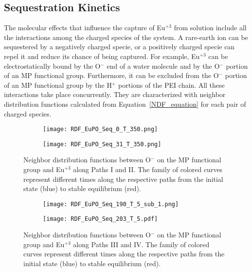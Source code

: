 \documentclass[
journal=jcisd8, %
manuscript=article,
layout=twocolumn   %
]{achemso}
\begin{document}
\subsection{Sequestration Kinetics}

The molecular effects that influence the capture of Eu$^{+3}$ from solution include  
all the interactions among the charged species of the system. A rare-earth ion can be sequestered by a negatively charged specie, or a positively charged specie can repel it and reduce its chance of being captured. For example, Eu$^{+3}$ can be electrostatically bound by the O$^-$ end of a water molecule and by the O$^-$ portion of an MP functional group. Furthermore, it can be excluded from the O$^-$ portion of an MP functional group by the H$^+$ portions of the PEI chain. All these interactions take place concurrently. They are characterized with neighbor distribution functions calculated from Equation~\ref{NDF_equation} for each pair of charged species. 

\begin{figure}[ht!]
	\begin{center}
	   \begin{subfigure}{0.45\textwidth}
    \texttt{[image: RDF\_EuPO\_Seq\_0\_T\_350.png]}
    \caption{} \label{fig:NDF-I}
    \texttt{[image: RDF\_EuPO\_Seq\_31\_T\_350.png]}
    \caption{} \label{fig:NDF-II}
      \end{subfigure}%
  \hspace*{\fill}
		\caption{
  Neighbor distribution functions between O$^-$ on the MP functional group and Eu$^{+3}$ along Paths I and II. The family of colored curves represent different times along the respective paths from the initial state (blue) to stable equilibrium (red).}
  \label{NDFheating}
  \end{center}
\end{figure}

\begin{figure}[ht!]
	\begin{center}
	\begin{subfigure}{0.45\textwidth}
    \texttt{[image: RDF\_EuPO\_Seq\_190\_T\_5\_sub\_1.png]}
    \caption{} \label{fig:NDF-III}
    \texttt{[image: RDF\_EuPO\_Seq\_203\_T\_5.pdf]}
    \caption{} \label{fig:NDF-IV}
      \end{subfigure}%
  \hspace*{\fill}
		\caption{
  Neighbor distribution functions between O$^-$ on the MP functional group and Eu$^{+3}$ along Paths III and IV. The family of colored curves represent different times along the respective paths from the initial state (blue) to stable equilibrium (red).}
  \label{NDFcooling}
  \end{center}
\end{figure}
\end{document}
